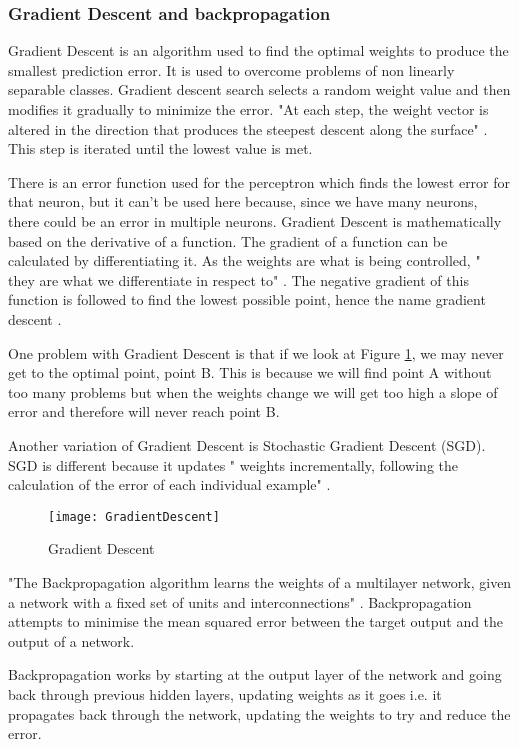 \tocless\subsubsection{Gradient Descent and backpropagation}
Gradient Descent is an algorithm used to find the optimal weights to produce the
smallest prediction error. It is used to overcome problems of non linearly
separable classes. Gradient descent search selects a random weight value and
then modifies it gradually to minimize the error. "At each step, the weight
vector is altered in the direction that produces the steepest descent along the
surface" \parencite{MLANN}. This step is iterated until the lowest value is met.

There is an error function used for the perceptron which finds the lowest error for that neuron, but it can't be used here because, since we have many neurons, there could be an error in multiple neurons.
Gradient Descent is mathematically based on the derivative of a function.
The gradient of a function can be calculated by differentiating it.
As the weights are what is being controlled, " they are what we differentiate in respect to" \parencite{MLAlgorithm}.
The negative gradient of this function is followed to find the lowest possible point, hence the name gradient descent \parencite{MLAlgorithm}.

One problem with Gradient Descent is that if we look at Figure \ref{fig:GD}, we may
never get to the optimal point, point B. This is because we will find point A
without too many problems but when the weights change we will get too high a
slope of error and therefore will never reach point B.

Another variation of Gradient Descent is Stochastic Gradient Descent (SGD). SGD
is different because it updates " weights incrementally, following the
calculation of the error of each individual example" \parencite{MLANN}. 

\begin{figure}[h]
      \texttt{[image: GradientDescent]}
      \caption{Gradient Descent}
      \label{fig:GD}
 \end{figure}

"The Backpropagation algorithm learns the weights of a multilayer network,
given a network with a fixed set of units and interconnections" \parencite{MLANN}.
Backpropagation attempts to minimise the mean squared error between the target
output and the output of a network.

Backpropagation works by starting at the output layer of the network and going
back through previous hidden layers, updating weights as it goes i.e. it propagates back through the network, updating the weights to try and reduce the error.

